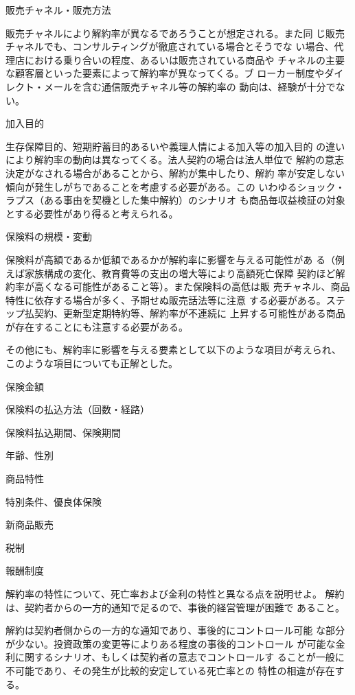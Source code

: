 \documentclass[report,gutter=10mm,fore-edge=10mm,uplatex,dvipdfmx]{jlreq}
\begin{document}
販売チャネル・販売方法

販売チャネルにより解約率が異なるであろうことが想定される。また同
じ販売チャネルでも、コンサルティングが徹底されている場合とそうでな
い場合、代理店における乗り合いの程度、あるいは販売されている商品や
チャネルの主要な顧客層といった要素によって解約率が異なってくる。ブ
ローカー制度やダイレクト・メールを含む通信販売チャネル等の解約率の
動向は、経験が十分でない。


加入目的

生存保障目的、短期貯蓄目的あるいや義理人情による加入等の加入目的
の違いにより解約率の動向は異なってくる。法人契約の場合は法人単位で
解約の意志決定がなされる場合があることから、解約が集中したり、解約
率が安定しない傾向が発生しがちであることを考慮する必要がある。この
いわゆるショック・ラプス（ある事由を契機とした集中解約）のシナリオ
も商品毎収益検証の対象とする必要性があり得ると考えられる。

保険料の規模・変動

保険料が高額であるか低額であるかが解約率に影響を与える可能性があ
る（例えば家族構成の変化、教育費等の支出の増大等により高額死亡保障
契約ほど解約率が高くなる可能性があること等）。また保険料の高低は販
売チャネル、商品特性に依存する場合が多く、予期せぬ販売話法等に注意
する必要がある。ステップ払契約、更新型定期特約等、解約率が不連続に
上昇する可能性がある商品が存在することにも注意する必要がある。

その他にも、解約率に影響を与える要素として以下のような項目が考えられ、
このような項目についても正解とした。

保険金額


保険料の払込方法（回数・経路）

保険料払込期間、保険期間

年齢、性別

商品特性

特別条件、優良体保険

新商品販売

税制

報酬制度

解約率の特性について、死亡率および金利の特性と異なる点を説明せよ。
\answer{}
解約は、契約者からの一方的通知で足るので、事後的経営管理が困難で
あること。

解約は契約者側からの一方的な通知であり、事後的にコントロール可能
な部分が少ない。投資政策の変更等によりある程度の事後的コントロール
が可能な金利に関するシナリオ、もしくは契約者の意志でコントロールす
ることが一般に不可能であり、その発生が比較的安定している死亡率との
特性の相違が存在する。
\end{document}
